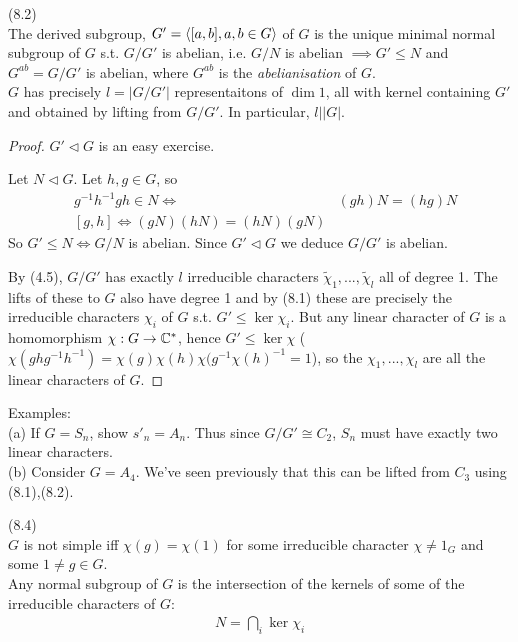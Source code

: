 \documentclass[a4paper]{article}
\begin{document}
\begin{lemma} (8.2)\\
The derived subgroup, $G' = \langle[a,b],a,b \in G \rangle$ of $G$ is the unique minimal normal subgroup of $G$ s.t. $G/G'$ is abelian, i.e. $G/N$ is abelian $\implies G' \leq N$ and $G^{ab}=G/G'$ is abelian, where $G^{ab}$ is the \emph{abelianisation} of $G$.\\
$G$ has precisely $l=|G/G'|$ representaitons of $\dim 1$, all with kernel containing $G'$ and obtained by lifting from $G/G'$. In particular, $l | |G|$.
\begin{proof}
$G'\triangleleft G$ is an easy exercise.

Let $N \triangleleft G$. Let $h,g \in G$, so 
\begin{equation*}
\begin{aligned}
&g^{-1}h^{-1}gh \in N \iff &(gh)N = (hg)N\\
&[g,h] \iff (gN)(hN) = (hN)(gN)
\end{aligned}
\end{equation*}
So $G' \leq N \iff G/N$ is abelian. Since $G' \triangleleft G$ we deduce $G/G'$ is abelian.

By (4.5), $G/G'$ has exactly $l$ irreducible characters $\tilde{\chi}_1,...,\tilde{\chi}_l$ all of degree 1. The lifts of these to $G$ also have degree 1 and by (8.1) these are precisely the irreducible characters $\chi_i$ of $G$ s.t. $G' \leq \ker \chi_i$. But any linear character of $G$ is a homomorphism $\chi:G \to \mathbb{C}^*$, hence $G' \leq \ker \chi$ ($\chi(ghg^{-1}h^{-1}) = \chi(g)\chi(h)\chi(g^{-1} \chi(h)^{-1} = 1$), so the $\chi_1,...,\chi_l$ are all the linear characters of $G$.
\end{proof}
\end{lemma}

Examples:\\
(a) If $G=S_n$, show $s'_n = A_n$. Thus since $G/G' \cong C_2$, $S_n$ must have exactly two linear characters.\\
(b) Consider $G=A_4$. We've seen previously that this can be lifted from $C_3$ using (8.1),(8.2).

\begin{lemma} (8.4)\\
$G$ is not simple iff $\chi(g) = \chi(1)$ for some irreducible character $\chi \neq 1_G$ and some $1 \neq g \in G$.\\
Any normal subgroup of $G$ is the intersection of the kernels of some of the irreducible characters of $G$:
\begin{equation*}
\begin{aligned}
N =\bigcap_i \ker \chi_i
\end{aligned}
\end{equation*}
\end{lemma}

\end{document}
